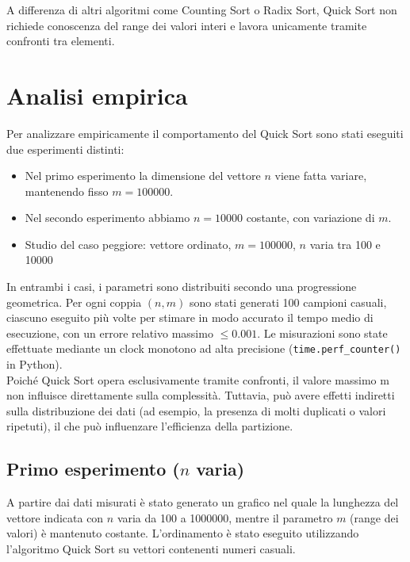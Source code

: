 \documentclass[a4paper, 12pt, oneside]{book}
\begin{document}
\noindent A differenza di altri algoritmi come Counting Sort o Radix Sort, Quick Sort non richiede conoscenza del range dei valori interi e lavora unicamente tramite confronti tra elementi.

\section{Analisi empirica}

Per analizzare empiricamente il comportamento del Quick Sort sono stati eseguiti due esperimenti distinti:

\begin{itemize}
    \item Nel primo esperimento la dimensione del vettore \(n\) viene fatta variare, mantenendo fisso \(m = 100000\).
    \item Nel secondo esperimento abbiamo \(n = 10000\) costante, con variazione di \(m\).
    \item Studio del caso peggiore: vettore ordinato, \(m = 100000\), \(n\) varia tra 100 e 10000
\end{itemize}

\noindent In entrambi i casi, i parametri sono distribuiti secondo una progressione geometrica.
Per ogni coppia \((n, m)\) sono stati generati 100 campioni casuali, ciascuno eseguito più volte per stimare in modo accurato il tempo medio di esecuzione, con un errore relativo massimo \(\leq 0.001\).
Le misurazioni sono state effettuate mediante un clock monotono ad alta precisione (\texttt{time.perf\_counter()} in Python). \\

\noindent
Poiché Quick Sort opera esclusivamente tramite confronti, il valore massimo m non influisce direttamente sulla complessità. Tuttavia, può avere effetti indiretti sulla distribuzione dei dati (ad esempio, la presenza di molti duplicati o valori ripetuti), il che può influenzare l'efficienza della partizione. \\

\subsection{Primo esperimento ($n$ varia)}

A partire dai dati misurati è stato generato un grafico nel quale la lunghezza del vettore indicata con \(n\) varia da 100 a 1000000, mentre il parametro \(m\) (range dei valori) è mantenuto costante. L'ordinamento è stato eseguito utilizzando l'algoritmo Quick Sort su vettori contenenti numeri casuali.
\end{document}
